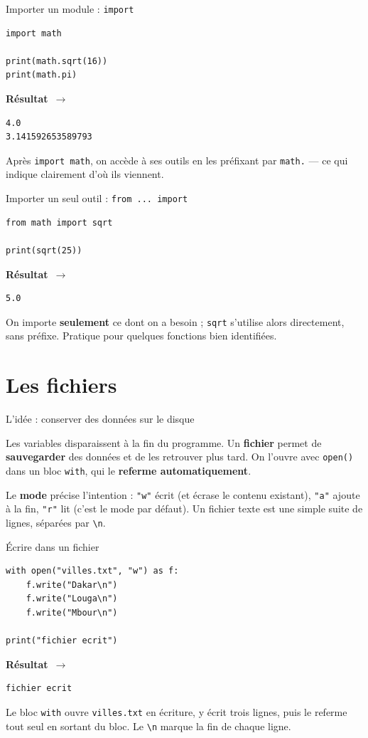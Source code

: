 \documentclass[aspectratio=169,11pt]{beamer}
\newcommand{\resultat}{{\scriptsize\textbf{R\'esultat}~$\rightarrow$}\par\vspace{1pt}}
\begin{document}
\begin{frame}[fragile]{Importer un module : \texttt{import}}
\begin{lstlisting}
import math

print(math.sqrt(16))
print(math.pi)
\end{lstlisting}
\resultat
\begin{lstlisting}[style=out]
4.0
3.141592653589793
\end{lstlisting}
{\small Après \texttt{import math}, on accède à ses outils en les préfixant par \texttt{math.} — ce qui indique clairement d'où ils viennent.}
\end{frame}

\begin{frame}[fragile]{Importer un seul outil : \texttt{from ... import}}
\begin{lstlisting}
from math import sqrt

print(sqrt(25))
\end{lstlisting}
\resultat
\begin{lstlisting}[style=out]
5.0
\end{lstlisting}
{\small On importe \textbf{seulement} ce dont on a besoin ; \texttt{sqrt} s'utilise alors directement, sans préfixe. Pratique pour quelques fonctions bien identifiées.}
\end{frame}

\section{Les fichiers}

\begin{frame}{L'idée : conserver des données sur le disque}
\begin{ucaddef}
{\small Les variables disparaissent à la fin du programme. Un \textbf{fichier} permet de \textbf{sauvegarder} des données et de les retrouver plus tard. On l'ouvre avec \texttt{open()} dans un bloc \texttt{with}, qui le \textbf{referme automatiquement}.}
\end{ucaddef}
{\small Le \textbf{mode} précise l'intention : \texttt{"w"} écrit (et écrase le contenu existant), \texttt{"a"} ajoute à la fin, \texttt{"r"} lit (c'est le mode par défaut). Un fichier texte est une simple suite de lignes, séparées par \texttt{\textbackslash n}.}
\end{frame}

\begin{frame}[fragile]{Écrire dans un fichier}
\begin{lstlisting}
with open("villes.txt", "w") as f:
    f.write("Dakar\n")
    f.write("Louga\n")
    f.write("Mbour\n")

print("fichier ecrit")
\end{lstlisting}
\resultat
\begin{lstlisting}[style=out]
fichier ecrit
\end{lstlisting}
{\small Le bloc \texttt{with} ouvre \texttt{villes.txt} en écriture, y écrit trois lignes, puis le referme tout seul en sortant du bloc. Le \texttt{\textbackslash n} marque la fin de chaque ligne.}
\end{frame}
\end{document}
